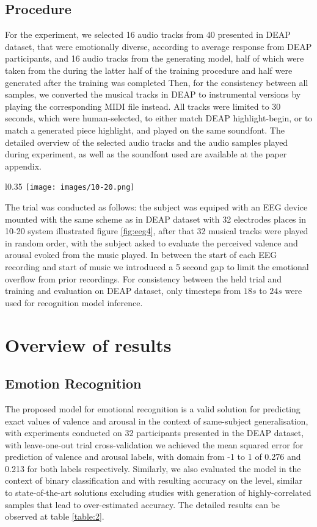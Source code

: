 \documentclass[14pt]{extreport}
\begin{document}
\subsection{Procedure}
For the experiment, we selected 16 audio tracks from 40 presented in DEAP dataset, that were emotionally diverse, according to average response from DEAP participants, and 16 audio tracks from the generating model, half of which were taken from the during the latter half of the training procedure and half were generated after the training was completed Then, for the consistency between all samples, we converted the musical tracks in DEAP to instrumental versions by playing the corresponding MIDI file instead. All tracks were limited to 30 seconds, which were human-selected, to either match DEAP highlight-begin, or to match a generated piece highlight, and played on the same soundfont. The detailed overview of the selected audio tracks and the audio samples played during experiment, as well as the soundfont used are available at the paper appendix.

\begin{wrapfigure}{l}{0.35\textwidth}
    \centering
\texttt{[image: images/10-20.png]}
\caption{10-20 electrode placement scheme used in the trial}
\label{fig:eeg4}
\end{wrapfigure}
The trial was conducted as follows: the subject was equiped with an EEG device mounted with the same scheme as in DEAP dataset with 32 electrodes places in 10-20 system illustrated figure \ref{fig:eeg4}, after that 32 musical tracks were played in random order, with the subject asked to evaluate the perceived \gls{valence} and \gls{arousal} evoked from the music played. In between the start of each EEG recording and start of music we introduced a 5 second gap to limit the emotional overflow from prior recordings. For consistency between the held trial and training and evaluation on DEAP dataset, only timesteps from $18s$ to $24s$ were used for recognition model inference.


\section{Overview of results}\label{section:res}
\subsection{Emotion Recognition}

The proposed model for emotional recognition is a valid solution for predicting exact values of \gls{valence} and \gls{arousal} in the context of same-subject generalisation, with experiments conducted on 32 participants presented in the DEAP dataset, with leave-one-out trial cross-validation we achieved the mean squared error for prediction of valence and arousal labels, with domain from -1 to 1 of 0.276 and 0.213 for both labels respectively. Similarly, we also evaluated the model in the context of binary classification and with resulting accuracy on the level, similar to state-of-the-art solutions excluding studies with generation of highly-correlated samples that lead to over-estimated accuracy. The detailed results can be observed at table \ref{table:2}.
\end{document}
